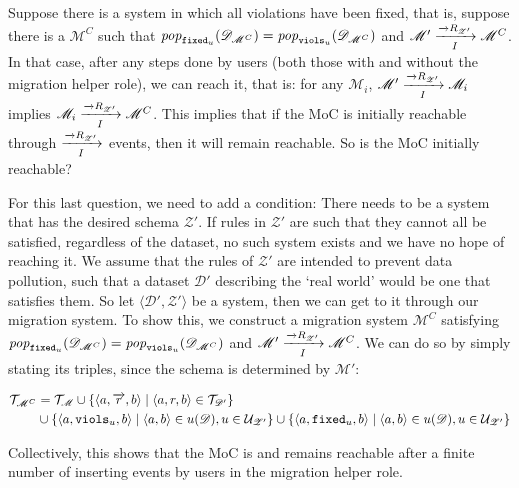 \documentclass[runningheads]{llncs}
\newcommand{\id}[1]{\text{\it #1\/}}
\newcommand{\popF}[1]{\id{pop}_{#1}}
\newcommand{\pop}[2]{\popF{#1}(#2)}
\newcommand{\viol}[2]{{#1}(#2)}
\newcommand{\pair}[2]{\langle{#1},{#2}\rangle}
\newcommand{\triple}[3]{\langle{#1},{#2},{#3}\rangle}
\newcommand{\rels}{\mathcal{R}}   %
\newcommand{\triples}{\mathcal{T}}
\newcommand{\rules}{\mathcal{U}}
\newcommand{\dataset}{\mathscr{D}}
\newcommand{\schema}{\mathscr{Z}}
\newcommand{\migrsys}{\mathscr{M}}
\begin{document}
   Suppose there is a system in which all violations have been fixed, that is, suppose there is a $\migrsys^C$ such that $\pop{{\tt fixed}_u}{\dataset_{\migrsys^C}}=\pop{{\tt viols}_u}{\dataset_{\migrsys^C}}$ and $\migrsys'\xrightarrow[I]{\overrightarrow\rels_{\schema'}} \migrsys^C$.
   In that case, after any steps done by users (both those with and without the migration helper role), we can reach it, that is: for any $\migrsys_i$, $\migrsys'\xrightarrow[I]{\overrightarrow\rels_{\schema'}} \migrsys_i$ implies $\migrsys_i\xrightarrow[I]{\overrightarrow\rels_{\schema'}} \migrsys^C$.
   This implies that if the MoC is initially reachable through $\xrightarrow[I]{\overrightarrow\rels_{\schema'}}$ events, then it will remain reachable.
   So is the MoC initially reachable?
   
   For this last question, we need to add a condition:
   There needs to be a system that has the desired schema $\schema'$.
   If rules in $\schema'$ are such that they cannot all be satisfied, regardless of the dataset, no such system exists and we have no hope of reaching it.
   We assume that the rules of $\schema'$ are intended to prevent data pollution, such that a dataset $\dataset'$ describing the `real world' would be one that satisfies them.
   So let $\pair{\dataset'}{\schema'}$ be a system, then we can get to it through our migration system.
   To show this, we construct a migration system $\migrsys^C$ satisfying $\pop{{\tt fixed}_u}{\dataset_{\migrsys^C}}=\pop{{\tt viols}_u}{\dataset_{\migrsys^C}}$ and $\migrsys'\xrightarrow[I]{\overrightarrow\rels_{\schema'}} \migrsys^C$.
   We can do so by simply stating its triples, since the schema is determined by $\migrsys'$:
   
\begin{align}
   \begin{aligned}
   \triples_{\migrsys^C} &= \triples_\migrsys 
   \cup \{\triple{a}{\overrightarrow{r}}{b} \mid \triple{a}{r}{b}\in\triples_{\dataset'}\}\\
   &\cup \{\triple{a}{{\tt viols}_u}{b} \mid \pair{a}{b}\in \viol{u}{\dataset}, u\in \rules_{\schema'} \}
   \cup \{\triple{a}{{\tt fixed}_u}{b} \mid \pair{a}{b}\in \viol{u}{\dataset}, u\in \rules_{\schema'} \}
   \end{aligned}
\end{align}
   
   Collectively, this shows that the MoC is and remains reachable after a finite number of inserting events by users in the migration helper role.
   
\end{document}
